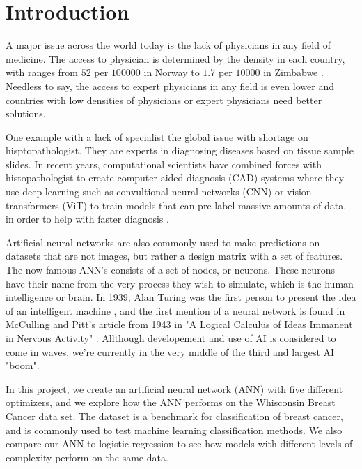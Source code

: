 \section{Introduction}\label{sec:introduction}

A major issue across the world today is the lack of physicians in any field of medicine. The access to physician is determined by the 
density in each country, with ranges from $52$ per $10 0000$ in Norway to $1.7$ per $10 000$ in Zimbabwe \cite{who_physicians}. Needless to say, 
the access to expert physicians in any field is even lower and countries with low densities of physicians or expert physicians need better
solutions. 

One example with a lack of specialist the global issue with shortage on hisptopathologist. They are experts in diagnosing 
diseases based on tissue sample slides. In recent years, computational scientists have combined forces with histopathologist to create computer-aided 
diagnosis (CAD) systems where they use deep learning such as convultional neural networks (CNN) or vision transformers (ViT)
to train models that can pre-label massive amounts of data, in order to help with faster diagnosis \cite{histopath_AI}.

Artificial neural networks are also commonly used to make predictions on datasets that are not images, but rather a design matrix with a set of features.
The now famous ANN's consists of a set of nodes, or neurons. These neurons have their name from the very process they wish to simulate, which is the
human intelligence or brain. In 1939, Alan Turing was the first person to present the idea of an intelligent machine \cite{turing_36}, and the first mention of a 
neural network is found in McCulling and Pitt's article from 1943 in "A Logical Calculus of Ideas Immanent in Nervous Activity" \cite{mccu_pitt}. 
Allthough developement and use of AI is considered to come in waves, we're currently in the very middle of the third and largest AI "boom". 

In this project, we create an artificial neural network (ANN) with five different optimizers, and we explore how the ANN performs on the 
Whisconsin Breast Cancer data set. The dataset is a benchmark for classification of breast cancer, and is commonly used to test machine learning 
classification methods. We also compare our ANN to logistic regression to see how models with different levels of complexity perform on the same data. 

